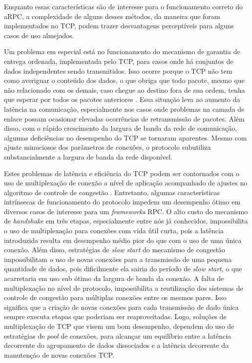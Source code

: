 Enquanto essas características são de interesse para o funcionamento correto do aRPC, a complexidade de alguns desses métodos, da maneira que foram implementados no TCP, podem trazer desvantagens perceptíveis para alguns casos de uso almejados.

Um problema em especial está no funcionamento do mecanismo de garantia de entrega ordenada, implementada pelo TCP, para casos onde há conjuntos de dados independentes sendo transmitidos. Isso ocorre porque o TCP não tem como averiguar o conteúdo dos dados, o que obriga que todo pacote, mesmo que não relacionado com os demais, caso chegue ao destino fora de sua ordem, tenha que esperar por todos os pacotes anteriores \cite{scharf2006nxg03}. Essa situação leva ao aumento da latência na comunicação, especialmente nos casos onde problemas na camada de enlace possam ocasionar elevadas ocorrências de retransmissão de pacotes. Além disso, com o rápido crescimento da largura de banda da rede de comunicação, algumas deficiências no desempenho do TCP se tornaram aparentes. Mesmo com ajuste minuciosos dos parâmetros de conexões, o protocolo subutiliza substancialmente a largura de banda da rede disponível. 

Estes problemas de latência e eficiência do TCP podem ser contornados com o uso de multiplexação de conexão a nível de aplicação acompanhado de ajustes no algoritmo de controle de congestão \cite{rfc5681}.
Entretanto, algumas características intrínsecas de funcionamento do protocolo impedem um desempenho ótimo em diversos casos de interesse para um \textit{frameworks} RPC. O alto custo do mecanismo de \textit{handshake} em três etapas, especialmente entre nós já conhecidos, impossibilita o uso de multiplexação para conexões com vida útil curta, pois a latência introduzida resulta em desempenho médio pior do que com o uso de uma única conexão. Além disso, estratégias de \textit{slow start} do mecanismo de congestão impossibilitam o uso de novas conexões para a transmissão de uma pequena quantidade de dados, pois dificilmente ela sairia do período de \textit{slow start}, o que acarretaria em uso sub ótimo da largura de banda da conexão. A falta de multiplexação no nível de protocolo, impossibilita a reutilização dos sistemas de controle de congestão para múltiplas conexões entre os mesmos pares. Isso significa que a criação de novas conexões para cada transmissão de dado única sempre executa etapas que poderiam ser reaproveitadas. Logo, soluções de multiplexação de TCP que visem um bom desempenho, dependem do uso de estratégias de \emph{pool} de conexões, para alcançar um equilíbrio entre a latência decorrente do agrupamento de dados dissociados e a latência decorrente da manutenção de novas conexões TCP.

